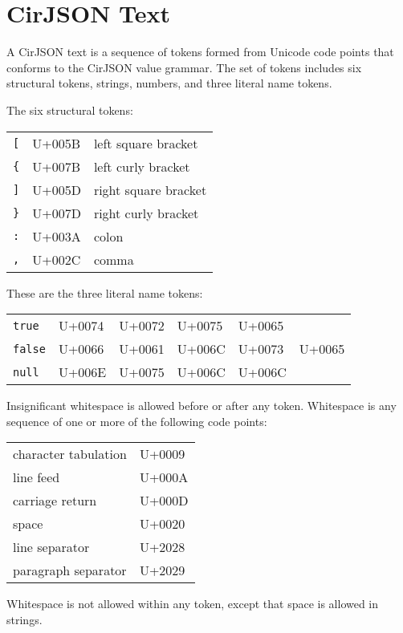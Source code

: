 
\section{CirJSON Text}

A CirJSON text is a sequence of tokens formed from Unicode code points that conforms to the CirJSON value grammar.
The set of tokens includes six structural tokens, strings, numbers, and three literal name tokens.

The six structural tokens:

\begin{table*}[htp]
	\begin{tabular}{lll}
		\texttt{[} & U+005B & left square bracket \\
		\texttt{\{} & U+007B & left curly bracket \\
		\texttt{]} & U+005D & right square bracket \\
		\texttt{\}} & U+007D & right curly bracket \\
		\texttt{:} & U+003A & colon \\
		\texttt{,} & U+002C & comma \\
	\end{tabular}
\end{table*}

These are the three literal name tokens:

\begin{table*}[htp]
	\begin{tabular}{llllll}
		\texttt{true} & U+0074 & U+0072 & U+0075 & U+0065 & ~ \\
		\texttt{false} & U+0066 & U+0061 & U+006C & U+0073 & U+0065 \\
		\texttt{null} & U+006E & U+0075 & U+006C & U+006C & ~ \\
	\end{tabular}
\end{table*}

Insignificant whitespace is allowed before or after any token.
Whitespace is any sequence of one or more of the following code points:

\FloatBarrier

\begin{table*}[!htbp]
	\begin{tabular}{ll}
		character tabulation & U+0009 \\
		line feed & U+000A \\
		carriage return & U+000D \\
		space & U+0020 \\
		line separator & U+2028 \\
		paragraph separator & U+2029 \\
	\end{tabular}
\end{table*}

\FloatBarrier

Whitespace is not allowed within any token, except that space is allowed in strings.
